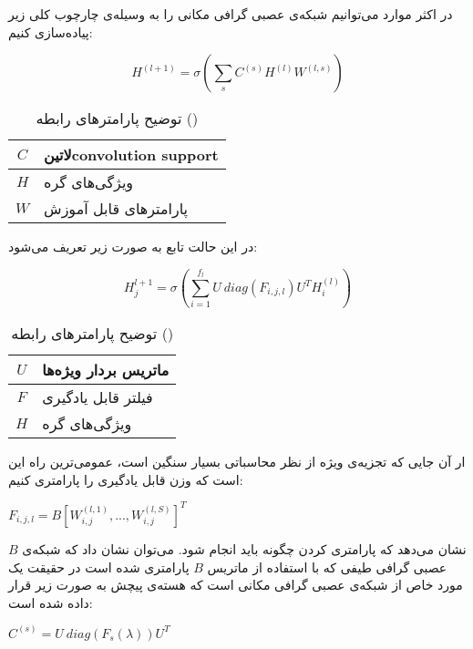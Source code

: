 در اکثر موارد می‌توانیم شبکه‌ی عصبی گرافی مکانی را به وسیله‌ی چارچوب کلی زیر پیاده‌سازی کنیم:

\begin{equation}
  \label{eq:spatial_1}
H^{(l+1)}=\sigma(\sum_{s}C^{(s)}H^{(l)}W^{(l,s)})
\end{equation}

\begin{table}[h]
  \centering
  \caption{توضیح پارامترهای رابطه ()}
  \begin{tabular}{|c|p{}|}
    \hline
    $C$ & ‌لاتین{convolution support} \\
    \hline
    $H$ & ویژگی‌های گره \\
    \hline
    $W$ & پارامترهای قابل آموزش \\
    \hline
  \end{tabular}
  \label{tbl:distance}
\end{table}


در این حالت تابع به صورت زیر تعریف می‌شود:

\begin{equation}
  \label{eq:spectral}
H_j^{l+1}=\sigma(\sum_{i=1}^{f_l}U\:diag(F_{i,j,l})U^TH_i^{(l)})
\end{equation}

\begin{table}[h]
  \centering
  \caption{توضیح پارامترهای رابطه ()}
  \begin{tabular}{|c|p{}|}
    \hline
    $U$ & ماتریس بردار ویژه‌ها \\
    \hline
    $F$ & فیلتر قابل یادگیری \\
    \hline
    $H$ & ویژگی‌های گره \\
    \hline
  \end{tabular}
  \label{tbl:distance}
\end{table}

ار آن جایی که تجزیه‌ی ویژه از نظر محاسباتی بسیار سنگین است، عمومی‌ترین راه این است که وزن قابل یادگیری را پارامتری کنیم:

$F_{i,j,l}=B[W_{i,j}^{(l,1)},...,W_{i,j}^{(l,S)}]^T$

$B$ نشان می‌دهد که پارامتری کردن چگونه باید انجام شود. می‌توان نشان داد که شبکه‌ی عصبی گرافی طیفی که با استفاده از ماتریس $B$ پارامتری شده است در حقیقت یک مورد خاص از شبکه‌ی عصبی گرافی مکانی است که هسته‌ی پیچش به صورت زیر قرار داده شده است:

$C^{(s)}=U\:diag(F_s(\lambda))U^T$

